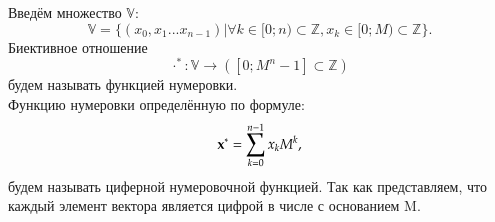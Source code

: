 Введём множество \(\mathbb{V}\):
\[ \mathbb{V} = \{(x_0, x_1 ... x_{n-1}) | \forall k \in [0;n) \subset \mathbb{Z}, x_k \in [0; M) \subset \mathbb{Z}\}.\]
Биективное отношение
\begin{equation}\label{number_function}
\cdot^* : \mathbb{V} \rightarrow ([0;M^n-1] \subset \mathbb{Z})
\end{equation}
будем называть функцией нумеровки.\\
Функцию нумеровки определённую по формуле:
\begin{equation}\label{number_function}
\bold{x}^* = \sum_{k=0}^{n-1}x_k M^k,
\end{equation}
будем называть циферной нумеровочной функцией.
Так как представляем, что каждый элемент вектора является цифрой
в числе с основанием M.
